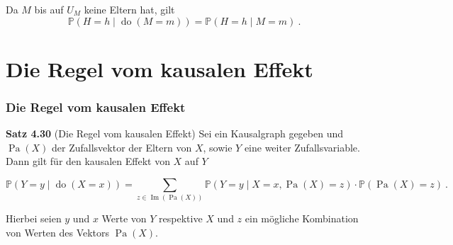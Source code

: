 \documentclass{beamer}
\newcommand{\Do}{\operatorname{do}}
\newcommand{\Pa}{\operatorname{Pa}}
\newcommand{\Bild}{\operatorname{Im}}
\newcommand{\klein}[1]{{\scriptsize #1}}
\begin{document}
\begin{frame}
\begin{columns}
\begin{column}{0.3\linewidth}
\begin{center}
\begin{scriptsize}
\end{scriptsize}
\end{center}
\end{column}
\end{columns}

\pause

Da $M$ bis auf $U_M$ keine Eltern hat, gilt
\[\mathbb{P}(H = h \mid \Do(M = m)) = \mathbb{P}(H = h \mid M = m)~.\]
\end{frame}

\section{Die Regel vom kausalen Effekt}

\begin{frame}
\frametitle{Die Regel vom kausalen Effekt}

\begin{block}{\textbf{Satz 4.30} \klein{(Die Regel vom kausalen Effekt)}}
Sei ein Kausalgraph gegeben und $\Pa(X)$ der Zufallsvektor der Eltern von $X$, sowie $Y$ eine weiter Zufallsvariable. Dann gilt für den kausalen Effekt von $X$ auf $Y$
\begin{scriptsize}
\[\mathbb{P}(Y = y \mid \Do(X = x)) = \sum_{z \in \Bild(\Pa(X))} \mathbb{P}(Y = y \mid X = x, \Pa(X) = z) \cdot \mathbb{P}(\Pa(X) = z)~.\]
\end{scriptsize}
Hierbei seien $y$ und $x$ Werte von $Y$ respektive $X$ und $z$ ein mögliche Kombination von Werten des Vektors $\Pa(X)$.
\end{block}
\end{frame}
\end{document}

